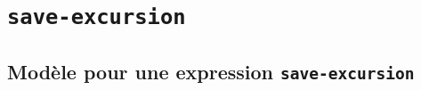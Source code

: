 \section{\texttt{save-excursion}}

\subsection{Modèle pour une expression
  \texttt{save-excursion}} 
